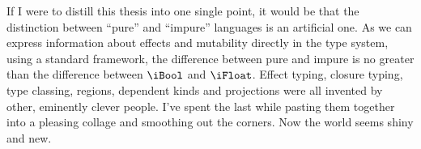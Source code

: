 If I were to distill this thesis into one single point, it would be that the distinction between ``pure'' and ``impure'' languages is an artificial one. As we can express information about effects and mutability directly in the type system, using a standard framework, the difference between pure and impure is no greater than the difference between $\iBool$ and $\iFloat$. Effect typing, closure typing, type classing, regions, dependent kinds and projections were all invented by other, eminently clever people. I've spent the last while pasting them together into a pleasing collage and smoothing out the corners. Now the world seems shiny and new.


